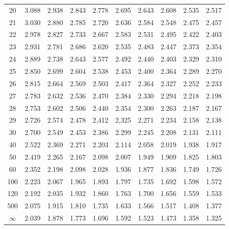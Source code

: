 \documentclass[12pt]{article}
\begin{document}
\begin{table}
\begin{center}
{\begin{tabular}{|c|c|c|c|c|c|c|c|c|c|}
	20 & 3.088 &2.938 &2.843 &2.778 &2.695 &2.643 &2.608 &2.535 &2.517\\
	21 & 3.030 &2.880 &2.785 &2.720 &2.636 &2.584 &2.548 &2.475 &2.457\\
	22 & 2.978 &2.827 &2.733 &2.667 &2.583 &2.531 &2.495 &2.422 &2.403\\
	23 & 2.931 &2.781 &2.686 &2.620 &2.535 &2.483 &2.447 &2.373 &2.354\\
	24 & 2.889 &2.738 &2.643 &2.577 &2.492 &2.440 &2.403 &2.329 &2.310\\
	25 & 2.850 &2.699 &2.604 &2.538 &2.453 &2.400 &2.364 &2.289 &2.270\\
	26 & 2.815 &2.664 &2.569 &2.503 &2.417 &2.364 &2.327 &2.252 &2.233\\
	27 & 2.783 &2.632 &2.536 &2.470 &2.384 &2.330 &2.294 &2.218 &2.198\\
	28 & 2.753 &2.602 &2.506 &2.440 &2.354 &2.300 &2.263 &2.187 &2.167\\
	29 & 2.726 &2.574 &2.478 &2,412 &2,325 &2,271 &2.234 &2.158 &2,138\\
	30 & 2.700 &2.549 &2.453 &2.386 &2.299 &2.245 &2.208 &2.131 &2.111\\
	40 & 2.522 &2.369 &2.271 &2.203 &2.114 &2.058 &2.019 &1.938 &1.917\\
	50 & 2.419 &2.265 &2.167 &2.098 &2.007 &1.949 &1.909 &1.825 &1.803\\
	60 & 2.352 &2.198 &2.098 &2.028 &1.936 &1.877 &1.836 &1.749 &1.726\\
	100 & 2.223 &2.067 &1.965 &1.893 &1.797 &1.735 &1.692 &1.598 &1.572\\
	120 & 2.192 &2.035 &1.932 &1.860 &1.763 &1.700 &1.656 &1.559 &1.533\\
	500 & 2.075 &1.915 &1.810 &1.735 &1.633 &1.566 &1.517 &1.408 &1.377\\ \hline
	$\infty$ & 2.039 &1.878 &1.773 &1.696 &1.592 &1.523 &1.473 &1.358 &1.325\\
	\hline
\end{tabular}
}
\end{center}
\end{table}
\end{document}
